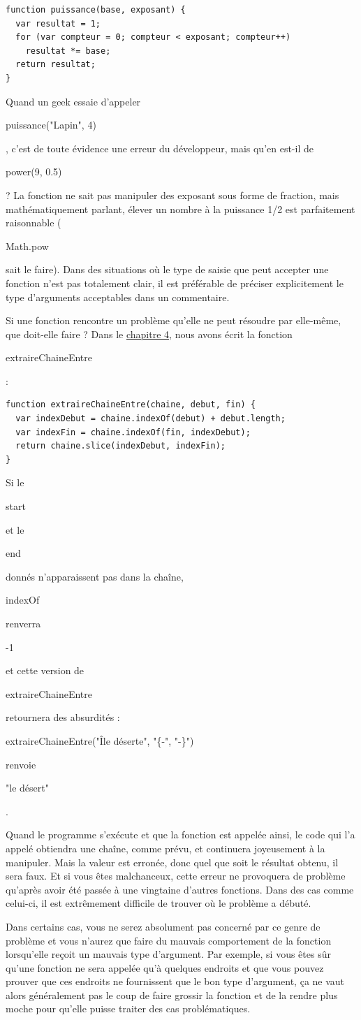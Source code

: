 \documentclass{FramateX}
\renewcommand{\texttt}[1]{\begin{sffamily}{#1}\end{sffamily}}
\begin{document}
\begin{lstlisting}
function puissance(base, exposant) {
  var resultat = 1;
  for (var compteur = 0; compteur < exposant; compteur++)
    resultat *= base;
  return resultat;
}
\end{lstlisting}
Quand un geek essaie d'appeler \texttt{puissance("Lapin", 4)}, c'est de
toute évidence une erreur du développeur, mais qu'en est-il de
\texttt{power(9, 0.5)} ? La fonction ne sait pas manipuler des exposant
sous forme de fraction, mais mathématiquement parlant, élever un nombre
à la puissance 1/2 est parfaitement raisonnable (\texttt{Math.pow} sait
le faire). Dans des situations où le type de saisie que peut accepter
une fonction n'est pas totalement clair, il est préférable de préciser
explicitement le type d'arguments acceptables dans un commentaire.

\begin{center}\end{center}

Si une fonction rencontre un problème qu'elle ne peut résoudre par
elle-même, que doit-elle faire ? Dans le \href{chapter4.html}{chapitre
4}, nous avons écrit la fonction \texttt{extraireChaineEntre} :

\begin{lstlisting}
function extraireChaineEntre(chaine, debut, fin) {
  var indexDebut = chaine.indexOf(debut) + debut.length;
  var indexFin = chaine.indexOf(fin, indexDebut);
  return chaine.slice(indexDebut, indexFin);
}
\end{lstlisting}
Si le \texttt{start} et le \texttt{end} donnés n'apparaissent pas dans
la chaîne, \texttt{indexOf} renverra \texttt{-1} et cette version de
\texttt{extraireChaineEntre} retournera des absurdités :
\texttt{extraireChaineEntre("Île déserte", "\{-", "-\}")} renvoie
\texttt{"le désert"}.

Quand le programme s'exécute et que la fonction est appelée ainsi, le
code qui l'a appelé obtiendra une chaîne, comme prévu, et continuera
joyeusement à la manipuler. Mais la valeur est erronée, donc quel que
soit le résultat obtenu, il sera faux. Et si vous êtes malchanceux,
cette erreur ne provoquera de problème qu'après avoir été passée à une
vingtaine d'autres fonctions. Dans des cas comme celui-ci, il est
extrêmement difficile de trouver où le problème a débuté.

Dans certains cas, vous ne serez absolument pas concerné par ce genre de
problème et vous n'aurez que faire du mauvais comportement de la
fonction lorsqu'elle reçoit un mauvais type d'argument. Par exemple, si
vous êtes sûr qu'une fonction ne sera appelée qu'à quelques endroits et
que vous pouvez prouver que ces endroits ne fournissent que le bon type
d'argument, ça ne vaut alors généralement pas le coup de faire grossir
la fonction et de la rendre plus moche pour qu'elle puisse traiter des
cas problématiques.
\end{document}
